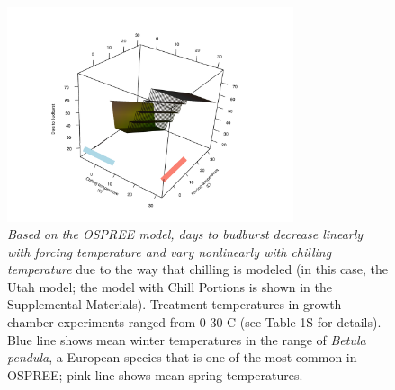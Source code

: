 \documentclass{article}
\begin{document}
\newpage
\begin{figure}[h!]
\centering
\noindent \includegraphics[width=0.75\textwidth]{..//..//analyses/bb_analysis/figures/bbmod_3dplot_utah_obs_edited.pdf}
\caption{\emph{Based on the OSPREE model, days to budburst decrease linearly with forcing temperature and vary nonlinearly with chilling temperature} due to the way that chilling is modeled (in this case, the Utah model; the model with Chill Portions is shown in the Supplemental Materials). Treatment temperatures in growth chamber experiments ranged from 0-30 \degree C (see Table 1S for details). Blue line shows mean winter temperatures in the range of \emph{Betula pendula}, a European species that is one of the most common in OSPREE; pink line shows mean spring temperatures. %
}
\label{fig:apc}
\end{figure}
\newpage
\end{document}

